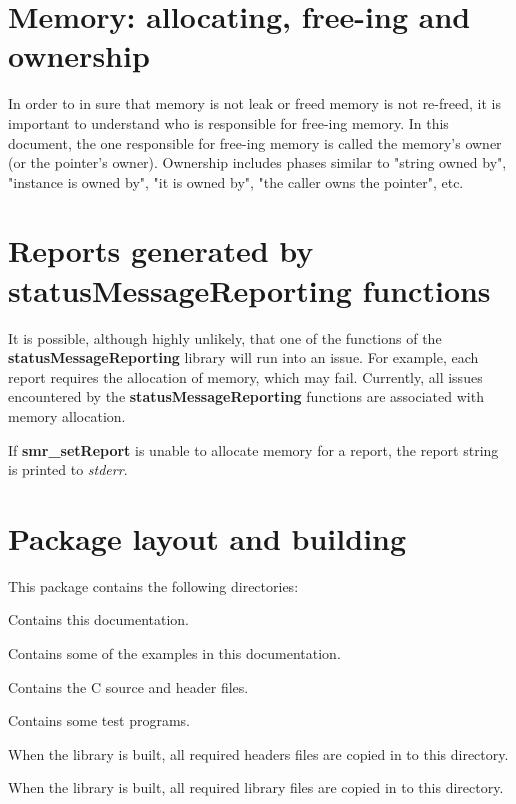 \documentclass[11pt]{article}
\begin{document}
\section{Memory: allocating, free-ing and ownership}
In order to in sure that memory is not leak or freed memory is not re-freed, it is important to understand who is responsible
for free-ing memory. In this document, the one responsible for free-ing memory is called the memory's owner (or the
pointer's owner). Ownership includes phases similar to "string owned by", "instance is owned by", "it is owned by", 
"the caller owns the pointer", etc.

\section{Reports generated by statusMessageReporting functions}
It is possible, although highly unlikely, that one of the functions of the \textbf{statusMessageReporting} library 
will run into an issue. For example, each report requires the allocation of memory, which may fail.
Currently, all issues encountered by the \textbf{statusMessageReporting} functions are associated with memory allocation.

If \textbf{smr\_setReport} is unable to allocate memory for a report, the report string is printed to \textit{stderr}.

\section{Package layout and building}

This package contains the following directories:

\begin{description}
\item{} Contains this documentation.
\item{} Contains some of the examples in this documentation.
\item{} Contains the C source and header files.
\item{} Contains some test programs.
\item{} When the library is built, all required headers files are copied in to this directory.
\item{} When the library is built, all required library files are copied in to this directory.
\end{description}
\end{document}
